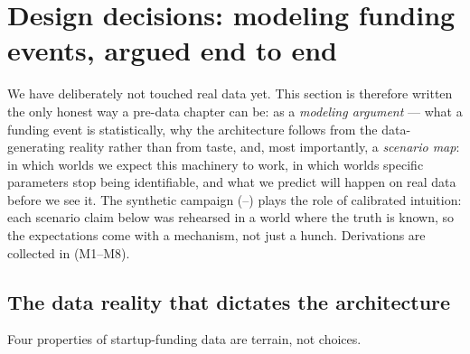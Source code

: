 \section{Design decisions: modeling funding events, argued end to end}
\label{sec:design}

We have deliberately not touched real data yet. This section is therefore
written the only honest way a pre-data chapter can be: as a \emph{modeling
argument} --- what a funding event is statistically, why the architecture
follows from the data-generating reality rather than from taste, and, most
importantly, a \emph{scenario map}: in which worlds we expect this machinery to
work, in which worlds specific parameters stop being identifiable, and what we
predict will happen on real data before we see it. The synthetic campaign
(--) plays the role of calibrated intuition: each
scenario claim below was rehearsed in a world where the truth is known, so the
expectations come with a mechanism, not just a hunch. Derivations are collected
in  (M1--M8).

\subsection{The data reality that dictates the architecture}
\label{sec:design_data}

Four properties of startup-funding data are terrain, not choices.


